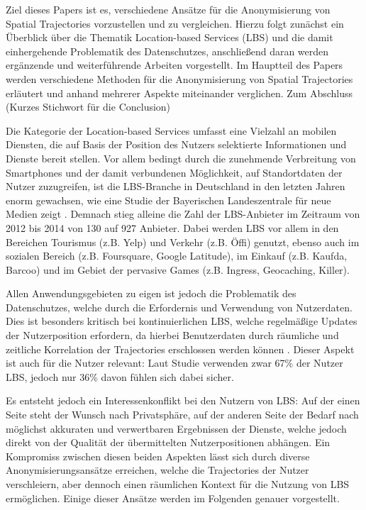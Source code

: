Ziel dieses Papers ist es, verschiedene Ansätze für die Anonymisierung von Spatial Trajectories vorzustellen und zu vergleichen. Hierzu folgt zunächst ein Überblick über die Thematik Location-based Services (LBS) und die damit einhergehende Problematik des Datenschutzes, anschließend daran werden ergänzende und weiterführende Arbeiten vorgestellt. Im Hauptteil des Papers werden verschiedene Methoden für die Anonymisierung von Spatial Trajectories erläutert und anhand mehrerer Aspekte miteinander verglichen. Zum Abschluss (Kurzes Stichwort für die Conclusion)

Die Kategorie der Location-based Services umfasst eine Vielzahl an mobilen Diensten, die auf Basis der Position des Nutzers selektierte Informationen und Dienste bereit stellen. Vor allem bedingt durch die zunehmende Verbreitung von Smartphones und der damit verbundenen Möglichkeit, auf Standortdaten der Nutzer zuzugreifen, ist die LBS-Branche in Deutschland in den letzten Jahren enorm gewachsen, wie eine Studie der Bayerischen Landeszentrale für neue Medien zeigt \cite{Consulting2014}. Demnach stieg alleine die Zahl der LBS-Anbieter im Zeitraum von 2012 bis 2014 von 130 auf 927 Anbieter. Dabei werden LBS vor allem in den Bereichen Tourismus (z.B. Yelp) und Verkehr (z.B. Öffi) genutzt, ebenso auch im sozialen Bereich (z.B. Foursquare, Google Latitude), im Einkauf (z.B. Kaufda, Barcoo) und im Gebiet der pervasive Games (z.B. Ingress, Geocaching, Killer).

Allen Anwendungsgebieten zu eigen ist jedoch die Problematik des Datenschutzes, welche durch die Erfordernis und Verwendung von Nutzerdaten. Dies ist besonders kritisch bei kontinuierlichen LBS, welche regelmäßige Updates der Nutzerposition erfordern, da hierbei Benutzerdaten durch räumliche und zeitliche Korrelation der Trajectories erschlossen werden können \cite{Chow2011}. Dieser Aspekt ist auch für die Nutzer relevant: Laut Studie verwenden zwar 67\% der Nutzer LBS, jedoch nur 36\% davon fühlen sich dabei sicher.

Es entsteht jedoch ein Interessenkonflikt bei den Nutzern von LBS: Auf der einen Seite steht der Wunsch nach Privatsphäre, auf der anderen Seite der Bedarf nach möglichst akkuraten und verwertbaren Ergebnissen der Dienste, welche jedoch direkt von der Qualität der übermittelten Nutzerpositionen abhängen. Ein Kompromiss zwischen diesen beiden Aspekten lässt sich durch diverse Anonymisierungsansätze erreichen, welche die Trajectories der Nutzer verschleiern, aber dennoch einen räumlichen Kontext für die Nutzung von LBS ermöglichen. Einige dieser Ansätze werden im Folgenden genauer vorgestellt.
